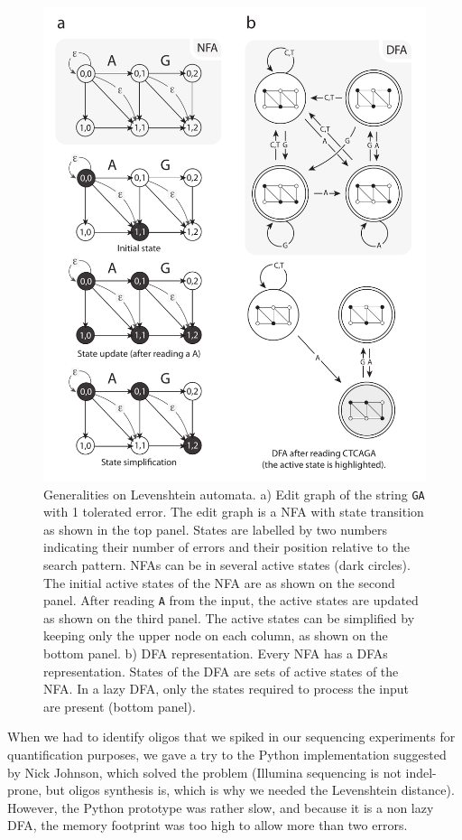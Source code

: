 \documentclass[12pt]{article}
\begin{document}
\begin{figure}[!tpb]
\centerline{\includegraphics[scale=.6]{edit_matrix.pdf}}
\caption{Generalities on Levenshtein automata. a) Edit graph
of the string \texttt{GA} with 1 tolerated error. The edit graph
is a NFA with state transition as shown in the top panel. States
are labelled by two numbers indicating their number of errors and
their position relative to the search pattern. NFAs can be in
several active states (dark circles). The initial active states
of the NFA are as shown on the second panel. After reading
\texttt{A} from the input, the active states are updated as shown
on the third panel. The active states can be simplified by keeping
only the upper node on each column, as shown on the bottom panel.
b) DFA representation. Every NFA has a DFAs representation.
States of the DFA are sets of active states of the NFA. In a
lazy DFA, only the states required to process the input are present
(bottom panel).
}\label{generalities}
\end{figure}

When we had to identify oligos that we spiked in our sequencing
experiments for quantification purposes,
we gave a try to the Python implementation suggested
by Nick Johnson, which solved the problem (Illumina sequencing is
not indel-prone, but oligos synthesis is, which is why we needed
the Levenshtein distance). However, the Python prototype was rather
slow, and because it is a non lazy DFA, the memory footprint was too
high to allow more than two errors.
\end{document}
